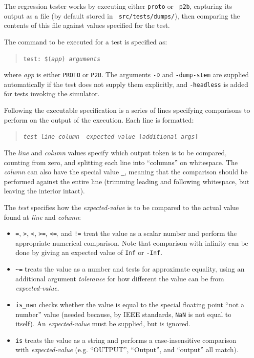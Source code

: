 \documentclass{article}
\newcommand\code[1]{\begin{quote}\var{#1}\end{quote}}
\newcommand\var[1]{{\tt #1}}
\begin{document}
The regression tester works by executing either {\tt proto} or {\tt
  p2b}, capturing its output as a file (by default stored in {\tt
  src/tests/dumps/}), then comparing the contents of this file against
values specified for the test.

The command to be executed for a test is specified as: \code{test:
  \$({\it app}) {\it arguments}} where {\it app} is either \var{PROTO}
or \var{P2B}.  The arguments \var{-D} and \var{-dump-stem} are
supplied automatically if the test does not supply them explicitly,
and \var{-headless} is added for tests invoking the simulator.

Following the executable specification is a series of lines specifying
comparisons to perform on the output of the execution.  Each line is
formatted: \code{{\it test} {\it line} {\it column} {\it
    expected-value} [{\it additional-args}]}

The {\it line} and {\it column} values specify which output token is to
be compared, counting from zero, and splitting each line into
``columns'' on whitespace.  The {\it column} can also have the special
value \var{\_}, meaning that the comparison should be performed
against the entire line (trimming leading and following whitespace,
but leaving the interior intact).

The {\it test} specifies how the {\it expected-value} is to be
compared to the actual value found at {\it line} and {\it column}:
\begin{itemize}
\item \var{=}, \var{>}, \var{<}, \var{>=}, \var{<=}, and \var{!=}
  treat the value as a scalar number and perform the appropriate
  numerical comparison.  Note that comparison with infinity can be
  done by giving an expected value of \var{Inf} or \var{-Inf}.
\item \var{\textasciitilde =} treats the value as a number and tests for approximate
  equality, using an additional argument {\it tolerance} for how
  different the value can be from {\it expected-value}.
\item \var{is\_nan} checks whether the value is equal to the special
  floating point ``not a number'' value (needed because, by IEEE
  standards, \var{NaN} is not equal to itself).  An {\it
    expected-value} must be supplied, but is ignored.
\item \var{is} treats the value as a string and performs a
  case-insensitive comparison with {\it expected-value}
  (e.g. ``OUTPUT'', ``Output'', and ``output'' all match).
\end{itemize}
  
\end{document}
